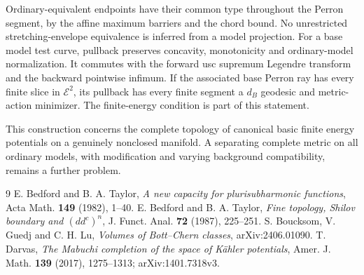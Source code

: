 \documentclass[11pt]{article}
\theoremstyle{remark}\newtheorem{remark}[theorem]{Remark}
\begin{document}
Ordinary-equivalent endpoints have their common type throughout the
Perron segment, by the affine maximum barriers and the chord bound.
No unrestricted stretching-envelope equivalence is inferred from a model
projection. For a base model test curve, pullback preserves concavity,
monotonicity and ordinary-model normalization. It commutes with the forward
usc supremum Legendre transform and the backward pointwise infimum.
If the associated base Perron ray has every finite slice in $\mathcal E^2$,
its pullback has every finite segment a $d_B$ geodesic and metric-action
minimizer. The finite-energy condition is part of this statement.

This construction concerns the complete topology of canonical basic
finite energy potentials on a genuinely nonclosed manifold. A separating
complete metric on all ordinary models, with modification and varying
background compatibility, remains a further problem.

\begin{thebibliography}{9}
 E. Bedford and B. A. Taylor,
\emph{A new capacity for plurisubharmonic functions},
Acta Math. \textbf{149} (1982), 1--40.
 E. Bedford and B. A. Taylor,
\emph{Fine topology, Shilov boundary and $(dd^c)^n$},
J. Funct. Anal. \textbf{72} (1987), 225--251.
 S. Boucksom, V. Guedj and C. H. Lu,
\emph{Volumes of Bott--Chern classes}, arXiv:2406.01090.
 T. Darvas,
\emph{The Mabuchi completion of the space of K\"ahler potentials},
Amer. J. Math. \textbf{139} (2017), 1275--1313;
arXiv:1401.7318v3.
\end{thebibliography}
\end{document}
